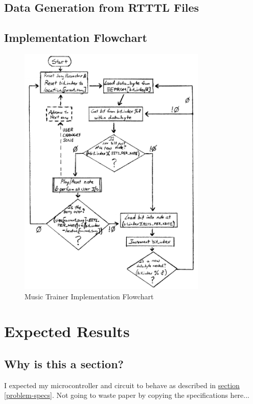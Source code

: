 \documentclass[11pt]{article}
\begin{document}
\subsection{Data Generation from RTTTL Files}

\subsection{Implementation Flowchart}

\begin{figure}[h!]
\centering
\includegraphics[width=0.8\textwidth]{music-trainer-flowchart.pdf}
\caption{Music Trainer Implementation Flowchart}
\label{music-trainer-flowchart}
\end{figure}

\section{Expected Results}

\subsection{Why is this a section?}
I expected my microcontroller and circuit to behave as described in
\hyperref[problem-specs]{section \ref{problem-specs}}.
Not going to waste paper by copying the specifications here...
\end{document}
